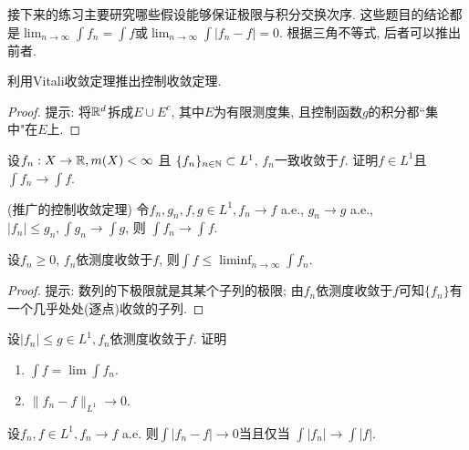 接下来的练习主要研究哪些假设能够保证极限与积分交换次序. 这些题目的结论都是$\lim_{n \to \infty}\int f_n = \int f$或$\lim_{n \to \infty}\int |f_n-f|=0$. 根据三角不等式, 后者可以推出前者.
\begin{exercise}
    利用Vitali收敛定理推出控制收敛定理.
\end{exercise}
\begin{proof}
    提示: 将$\mathbb{R}^d$拆成$E \cup E^c$, 其中$E$为有限测度集, 且控制函数$g$的积分都``集中"在$E$上. 
\end{proof}
\begin{exercise}
    设$f_n: X \to \mathbb{R}, m(X) < \infty$ 且 $\{f_n\}_{n \in \mathbb{N}} \subset L^1$, $f_n$一致收敛于$f$. 证明$f \in L^1$且$\int f_n \to \int f$.  
\end{exercise}
\begin{exercise} %
    (推广的控制收敛定理) 令$f_n, g_n, f, g \in L^1, f_n \to f$ a.e., $g_n \to g$ a.e., $|f_n| \leq g_n, \int g_n \to \int g$, 则
    $\int f_n \to \int f$. 
\end{exercise}

\begin{exercise}
    设$f_n \geq 0$, $f_n$依测度收敛于$f$, 则$\int f \leq \liminf_{n \to \infty} \int f_n$.
\end{exercise}
\begin{proof}
    提示: 数列的下极限就是其某个子列的极限; 由$f_n$依测度收敛于$f$可知$\{f_n\}$有一个几乎处处(逐点)收敛的子列.
\end{proof}
\begin{exercise}
    设$|f_n|\leq g \in L^1, f_n$依测度收敛于$f$. 证明
    \begin{enumerate}
        \item $\int f = \lim \int f_n$.
        \item $\|f_n - f\|_{L^1} \to 0$.
    \end{enumerate}
\end{exercise}
\begin{exercise}
    设$f_n, f \in L^1, f_n \to f$ a.e. 则$\int |f_n-f| \to 0$当且仅当
    $\int |f_n| \to \int |f|$. 
\end{exercise}
\begin{exercise} %
    
\end{exercise}


